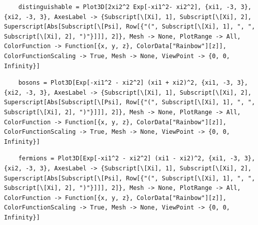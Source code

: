 \documentclass[11pt]{article}
\begin{document}
\begin{lstlisting}
    distinguishable = Plot3D[2xi2^2 Exp[-xi1^2- xi2^2], {xi1, -3, 3}, {xi2, -3, 3}, AxesLabel -> {Subscript[\[Xi], 1], Subscript[\[Xi], 2], Superscript[Abs[Subscript[\[Psi], Row[{"(", Subscript[\[Xi], 1], ", ", Subscript[\[Xi], 2], ")"}]]], 2]}, Mesh -> None, PlotRange -> All, ColorFunction -> Function[{x, y, z}, ColorData["Rainbow"][z]], ColorFunctionScaling -> True, Mesh -> None, ViewPoint -> {0, 0, Infinity}]
\end{lstlisting}

\begin{lstlisting}
    bosons = Plot3D[Exp[-xi1^2 - xi2^2] (xi1 + xi2)^2, {xi1, -3, 3}, {xi2, -3, 3}, AxesLabel -> {Subscript[\[Xi], 1], Subscript[\[Xi], 2], Superscript[Abs[Subscript[\[Psi], Row[{"(", Subscript[\[Xi], 1], ", ", Subscript[\[Xi], 2], ")"}]]], 2]}, Mesh -> None, PlotRange -> All, ColorFunction -> Function[{x, y, z}, ColorData["Rainbow"][z]], ColorFunctionScaling -> True, Mesh -> None, ViewPoint -> {0, 0, Infinity}]
\end{lstlisting}

\begin{lstlisting}
    fermions = Plot3D[Exp[-xi1^2 - xi2^2] (xi1 - xi2)^2, {xi1, -3, 3}, {xi2, -3, 3}, AxesLabel -> {Subscript[\[Xi], 1], Subscript[\[Xi], 2], Superscript[Abs[Subscript[\[Psi], Row[{"(", Subscript[\[Xi], 1], ", ", Subscript[\[Xi], 2], ")"}]]], 2]}, Mesh -> None, PlotRange -> All, ColorFunction -> Function[{x, y, z}, ColorData["Rainbow"][z]], ColorFunctionScaling -> True, Mesh -> None, ViewPoint -> {0, 0, Infinity}]
\end{lstlisting}
\end{document}
